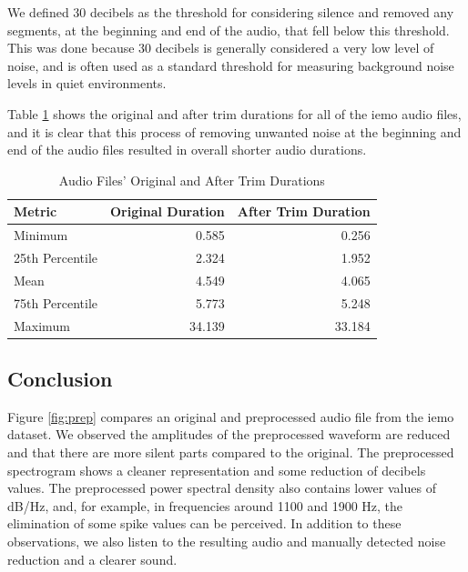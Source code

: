 We defined 30 decibels as the threshold for considering silence and removed any segments, at the beginning and end of the audio, that fell below this threshold. This was done because 30 decibels is generally considered a very low level of noise, and is often used as a standard threshold for measuring background noise levels in quiet environments.

Table \ref{trim_durations} shows the original and after trim durations for all of the \ac{iemo} audio files, and it is clear that this process of removing unwanted noise at the beginning and end of the audio files resulted in overall shorter audio durations.

\begin{table}[H]
	\centering
	\caption{Audio Files' Original and After Trim Durations}
	\label{trim_durations}
	\begin{tabular}{lrr}
		\toprule
		Metric & Original Duration & After Trim Duration \\
		\midrule
		Minimum  		&  0.585 	&  0.256 \\
		25th Percentile &  2.324	&  1.952 \\
		Mean 			&  4.549  	&  4.065 \\
		75th Percentile	&  5.773	&  5.248 \\
		Maximum 		& 34.139   	& 33.184 \\
		\bottomrule
	\end{tabular}
\end{table}



\subsection{Conclusion}

Figure \ref{fig:prep} compares an original and preprocessed audio file from the \ac{iemo} dataset. We observed the amplitudes of the preprocessed waveform are reduced and that there are more silent parts compared to the original. The preprocessed spectrogram shows a cleaner representation and some reduction of decibels values. The preprocessed power spectral density also contains lower values of dB/Hz, and, for example, in frequencies around 1100 and 1900 Hz, the elimination of some spike values can be perceived. In addition to these observations, we also listen to the resulting audio and manually detected noise reduction and a clearer sound.

